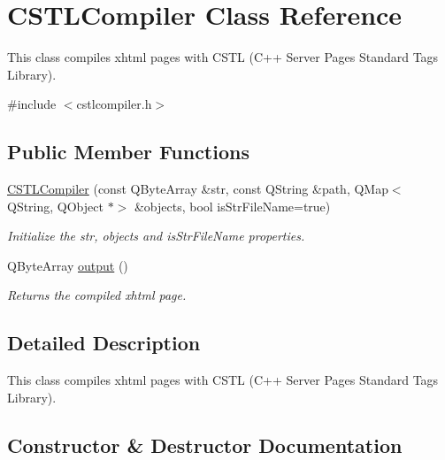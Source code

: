 \hypertarget{class_c_s_t_l_compiler}{}\section{C\+S\+T\+L\+Compiler Class Reference}
\label{class_c_s_t_l_compiler}


This class compiles xhtml pages with C\+S\+TL (C++ Server Pages Standard Tags Library).  




{\ttfamily \#include $<$cstlcompiler.\+h$>$}

\subsection*{Public Member Functions}
\begin{DoxyCompactItemize}
\item 
\hyperlink{class_c_s_t_l_compiler_a2ff8b8d08a280dea2f9b7474a9759e8f}{C\+S\+T\+L\+Compiler} (const Q\+Byte\+Array \&str, const Q\+String \&path, Q\+Map$<$ Q\+String, Q\+Object $\ast$$>$ \&objects, bool is\+Str\+File\+Name=true)
\begin{DoxyCompactList}\small\item\em Initialize the str, objects and is\+Str\+File\+Name properties. \end{DoxyCompactList}\item 
Q\+Byte\+Array \hyperlink{class_c_s_t_l_compiler_a3cce5a503e81c5de099859fe0ae1c386}{output} ()
\begin{DoxyCompactList}\small\item\em Returns the compiled xhtml page. \end{DoxyCompactList}\end{DoxyCompactItemize}


\subsection{Detailed Description}
This class compiles xhtml pages with C\+S\+TL (C++ Server Pages Standard Tags Library). 

\subsection{Constructor \& Destructor Documentation}
\mbox{\label{class_c_s_t_l_compiler_a2ff8b8d08a280dea2f9b7474a9759e8f}} 

